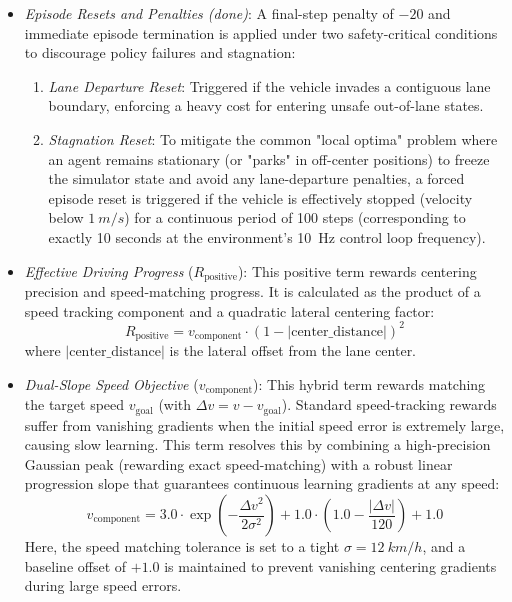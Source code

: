 \documentclass[sn-mathphys,Numbered]{sn-jnl}
\begin{document}
\begin{itemize}

    \item \textit{Episode Resets and Penalties (done)}: A final-step penalty of $-20$ and immediate episode termination is applied under two safety-critical conditions to discourage policy failures and stagnation:
    \begin{enumerate}
        \item \textit{Lane Departure Reset}: Triggered if the vehicle invades a contiguous lane boundary, enforcing a heavy cost for entering unsafe out-of-lane states.
        \item \textit{Stagnation Reset}: To mitigate the common "local optima" problem where an agent remains stationary (or "parks" in off-center positions) to freeze the simulator state and avoid any lane-departure penalties, a forced episode reset is triggered if the vehicle is effectively stopped (velocity below $\SI{1}{m/s}$) for a continuous period of 100 steps (corresponding to exactly 10 seconds at the environment's 10~Hz control loop frequency).
    \end{enumerate}

    \item \textit{Effective Driving Progress} ($R_{\text{positive}}$): This positive term rewards centering precision and speed-matching progress. It is calculated as the product of a speed tracking component and a quadratic lateral centering factor:
        $$R_{\text{positive}} = v_{\text{component}} \cdot (1 - |\text{center\_distance}|)^2$$
        where $|\text{center\_distance}|$ is the lateral offset from the lane center.

    \item \textit{Dual-Slope Speed Objective} ($v_{\text{component}}$): This hybrid term rewards matching the target speed $v_{\text{goal}}$ (with $\Delta v = v - v_{\text{goal}}$). Standard speed-tracking rewards suffer from vanishing gradients when the initial speed error is extremely large, causing slow learning. This term resolves this by combining a high-precision Gaussian peak (rewarding exact speed-matching) with a robust linear progression slope that guarantees continuous learning gradients at any speed:
        $$v_{\text{component}} = 3.0 \cdot \exp\left(-\frac{\Delta v^2}{2\sigma^2}\right) + 1.0 \cdot \left(1.0 - \frac{|\Delta v|}{120}\right) + 1.0$$
        Here, the speed matching tolerance is set to a tight $\sigma = \SI{12}{km/h}$, and a baseline offset of $+1.0$ is maintained to prevent vanishing centering gradients during large speed errors.


\end{itemize}
\end{document}
